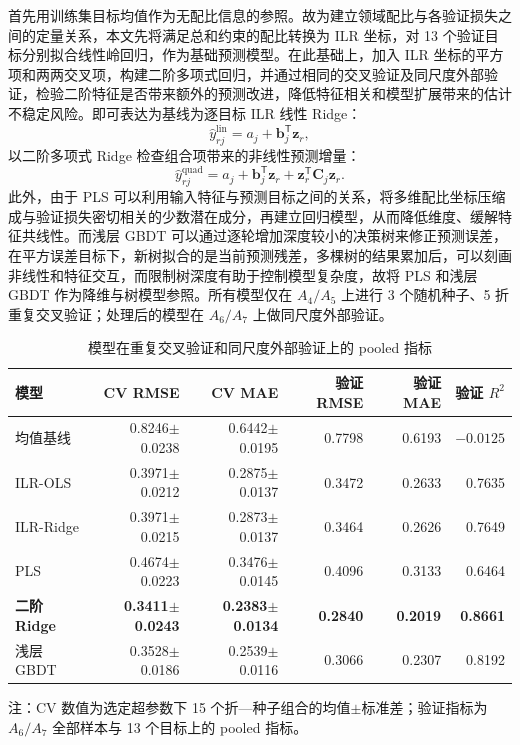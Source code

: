 首先用训练集目标均值作为无配比信息的参照。故为建立领域配比与各验证损失之间的定量关系，本文先将满足总和约束的配比转换为 ILR 坐标，对 13 个验证目标分别拟合线性岭回归，作为基础预测模型。在此基础上，加入 ILR 坐标的平方项和两两交叉项，构建二阶多项式回归，并通过相同的交叉验证及同尺度外部验证，检验二阶特征是否带来额外的预测改进，降低特征相关和模型扩展带来的估计不稳定风险。即可表达为基线为逐目标 ILR 线性 Ridge：
\begin{equation}
  \widehat y_{rj}^{\mathrm{lin}}=a_j+\boldsymbol b_j^{\mathsf T}\boldsymbol z_r,
  \label{eq:q13-linear}
\end{equation}
以二阶多项式 Ridge 检查组合项带来的非线性预测增量：
\begin{equation}
  \widehat y_{rj}^{\mathrm{quad}}
  =a_j+\boldsymbol b_j^{\mathsf T}\boldsymbol z_r
   +\boldsymbol z_r^{\mathsf T}\boldsymbol C_j\boldsymbol z_r.
  \label{eq:q13-quadratic}
\end{equation}
此外，由于 PLS 可以利用输入特征与预测目标之间的关系，将多维配比坐标压缩成与验证损失密切相关的少数潜在成分，再建立回归模型，从而降低维度、缓解特征共线性。而浅层 GBDT 可以通过逐轮增加深度较小的决策树来修正预测误差，在平方误差目标下，新树拟合的是当前预测残差，多棵树的结果累加后，可以刻画非线性和特征交互，而限制树深度有助于控制模型复杂度，故将 PLS 和浅层 GBDT 作为降维与树模型参照。所有模型仅在 $A_4/A_5$ 上进行 3 个随机种子、5 折重复交叉验证；处理后的模型在 $A_6/A_7$ 上做同尺度外部验证。

\begin{table}[htbp]
  \centering
  \caption{模型在重复交叉验证和同尺度外部验证上的 pooled 指标}
  \label{tab:q13-model-benchmark}
  \renewcommand{\arraystretch}{1.12}
  \begin{tabular}{lrrrrr}
    \toprule
    模型 & CV RMSE & CV MAE & 验证 RMSE & 验证 MAE & 验证 $R^2$ \\
    \midrule
    均值基线 & 0.8246$\pm$0.0238 & 0.6442$\pm$0.0195 & 0.7798 & 0.6193 & $-0.0125$ \\
    ILR-OLS & 0.3971$\pm$0.0212 & 0.2875$\pm$0.0137 & 0.3472 & 0.2633 & 0.7635 \\
    ILR-Ridge & 0.3971$\pm$0.0215 & 0.2873$\pm$0.0137 & 0.3464 & 0.2626 & 0.7649 \\
    PLS & 0.4674$\pm$0.0223 & 0.3476$\pm$0.0145 & 0.4096 & 0.3133 & 0.6464 \\
    \textbf{二阶 Ridge} & \textbf{0.3411$\pm$0.0243} & \textbf{0.2383$\pm$0.0134} & \textbf{0.2840} & \textbf{0.2019} & \textbf{0.8661} \\
    浅层 GBDT & 0.3528$\pm$0.0186 & 0.2539$\pm$0.0116 & 0.3066 & 0.2307 & 0.8192 \\
    \bottomrule
  \end{tabular}
  \vspace{1mm}
  \parbox{0.95\linewidth}{\footnotesize 注：CV 数值为选定超参数下 15 个折—种子组合的均值$\pm$标准差；验证指标为 $A_6/A_7$ 全部样本与 13 个目标上的 pooled 指标。}
\end{table}

